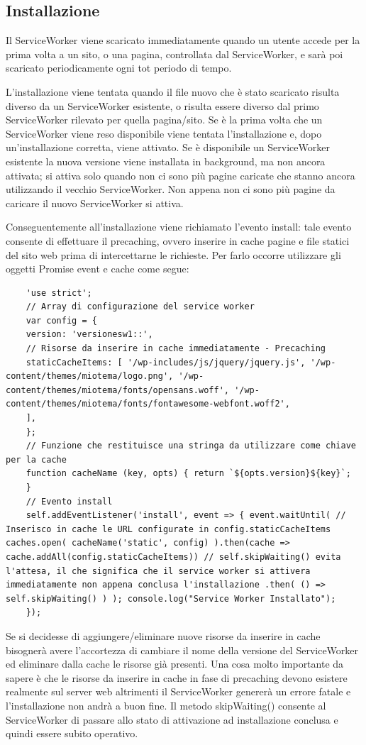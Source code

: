 \documentclass[11pt ,a4paper , twoside , openright ]{article}
\begin{document}
\subsection{Installazione}
Il ServiceWorker viene scaricato immediatamente quando un utente accede per la prima volta a un sito, o una pagina, controllata dal ServiceWorker, e sarà poi scaricato periodicamente ogni tot periodo di tempo.

L'installazione viene tentata quando il file nuovo che è stato scaricato risulta diverso da un ServiceWorker esistente, o risulta essere diverso dal primo ServiceWorker rilevato per quella pagina/sito. Se è la prima volta che un ServiceWorker viene reso disponibile viene tentata l'installazione e, dopo un'installazione corretta, viene attivato. Se è disponibile un ServiceWorker esistente la nuova versione viene installata in background, ma non ancora attivata; si attiva solo quando non ci sono più pagine caricate che stanno ancora utilizzando il vecchio ServiceWorker. Non appena non ci sono più pagine da caricare il nuovo ServiceWorker si attiva.

Conseguentemente all’installazione viene richiamato l’evento install: tale evento consente di effettuare il precaching, ovvero inserire in cache pagine e file statici del sito web prima di intercettarne le richieste. Per farlo occorre utilizzare gli oggetti Promise event e cache come segue:
\begin{lstlisting}
	'use strict';
	// Array di configurazione del service worker
	var config = {
	version: 'versionesw1::',
	// Risorse da inserire in cache immediatamente - Precaching
	staticCacheItems: [ '/wp-includes/js/jquery/jquery.js', '/wp-content/themes/miotema/logo.png', '/wp-content/themes/miotema/fonts/opensans.woff', '/wp-content/themes/miotema/fonts/fontawesome-webfont.woff2',
	],
	};
	// Funzione che restituisce una stringa da utilizzare come chiave per la cache
	function cacheName (key, opts) { return `${opts.version}${key}`;
	}
	// Evento install
	self.addEventListener('install', event => { event.waitUntil( // Inserisco in cache le URL configurate in config.staticCacheItems caches.open( cacheName('static', config) ).then(cache => cache.addAll(config.staticCacheItems)) // self.skipWaiting() evita l'attesa, il che significa che il service worker si attivera immediatamente non appena conclusa l'installazione .then( () => self.skipWaiting() ) ); console.log("Service Worker Installato");
	});
\end{lstlisting}
Se si decidesse di aggiungere/eliminare nuove risorse da inserire in cache bisognerà avere l’accortezza di cambiare il nome della versione del ServiceWorker ed eliminare dalla cache le risorse già presenti.
Una cosa molto importante da sapere è che le risorse da inserire in cache in fase di precaching devono esistere realmente sul server web altrimenti il ServiceWorker genererà un errore fatale e l’installazione non andrà a buon fine. 
Il metodo skipWaiting() consente al ServiceWorker di passare allo stato di attivazione ad installazione conclusa e quindi essere subito operativo.
\end{document}
